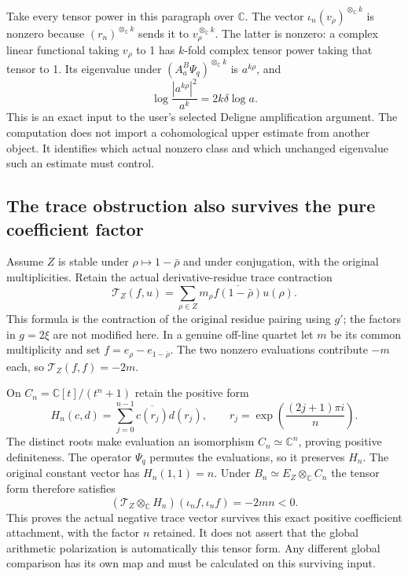 Take every tensor power in this paragraph over $\mathbb C$.
The vector $\iota_n(v_\rho)^{\otimes_{\mathbb C} k}$
is nonzero because $(r_n)^{\otimes_{\mathbb C} k}$ sends it to
$v_\rho^{\otimes_{\mathbb C} k}$. The latter is nonzero: a
complex linear functional taking $v_\rho$ to 1 has $k$-fold complex
tensor power taking that tensor to 1.
Its eigenvalue under $(A_a^B\Psi_q)^{\otimes_{\mathbb C} k}$ is $a^{k\rho}$,
and
\[
 \log\frac{|a^{k\rho}|^2}{a^k}=2k\delta\log a.
\]
This is an exact input to the user's selected Deligne amplification
argument. The computation does not import a cohomological upper
estimate from another object. It identifies which actual nonzero
class and which unchanged eigenvalue such an estimate must control.

\subsection{The trace obstruction also survives the pure coefficient factor}

Assume $Z$ is stable under $\rho\mapsto1-\bar\rho$ and under
conjugation, with the original multiplicities. Retain the actual
derivative-residue trace contraction
\[
 \mathcal T_Z(f,u)=\sum_{\rho\in Z}
 m_\rho\overline{f(1-\bar\rho)}u(\rho).
\]
This formula is the contraction of the original residue pairing
using $g'$; the factors in $g=2\xi$ are not modified here.
In a genuine off-line quartet let $m$ be its common multiplicity
and set $f=e_\rho-e_{1-\bar\rho}$. The two nonzero evaluations
contribute $-m$ each, so $\mathcal T_Z(f,f)=-2m$.

On $C_n=\mathbb C[t]/(t^n+1)$ retain the positive form
\[
 H_n(c,d)=\sum_{j=0}^{n-1}\overline{c(r_j)}d(r_j),
 \qquad r_j=\exp\left(\frac{(2j+1)\pi i}{n}\right).
\]
The distinct roots make evaluation an isomorphism
$C_n\simeq\mathbb C^n$, proving positive definiteness. The
operator $\Psi_q$ permutes the evaluations, so it preserves $H_n$.
The original constant vector has $H_n(1,1)=n$.
Under $B_n\simeq E_Z\otimes_{\mathbb C}C_n$ the tensor form
therefore satisfies
\[
 (\mathcal T_Z\otimes_{\mathbb C} H_n)(\iota_n f,\iota_n f)
 =-2mn<0.
\]
This proves the actual negative trace vector survives this exact
positive coefficient attachment, with the factor $n$ retained.
It does not assert that the global arithmetic polarization is
automatically this tensor form. Any different global comparison
has its own map and must be calculated on this surviving input.
